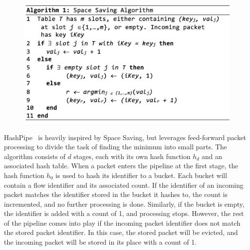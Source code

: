 \begin{figure}[t]
  \centering
    \includegraphics[scale=0.42]{alg1}
     \label{fig:alg1}
\end{figure}
HashPipe~\cite{hashpipe} is heavily inspired by Space Saving, but leverages feed-forward packet processing to divide the task of finding the minimum into small parts. The algorithm consists of $d$ stages, each with its own hash function $h_d$ and an associated hash table. When a packet enters the pipeline at the first stage, the hash function $h_0$ is used to hash its identifier to a bucket. Each bucket will contain a flow identifier and its associated count. If the identifier of an incoming packet matches the identifier stored in the bucket it hashes to, the count is incremented, and no further processing is done. Similarly, if the bucket is empty, the identifier is added with a count of 1, and processing stops. However, the rest of the pipeline comes into play if the incoming packet identifier does not match the stored packet identifier. In this case, the stored packet will be evicted, and the incoming packet will be stored in its place with a count of 1. 
